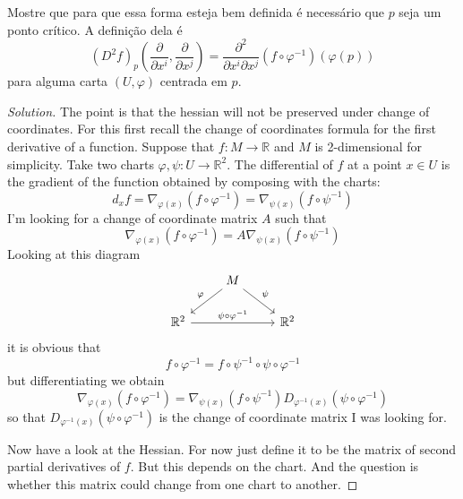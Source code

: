 \begin{exercise}\leavevmode
Mostre que para que essa forma esteja bem definida é necessário que \(p\) seja um ponto crítico. A definição dela é
\[(D^2f)_p\left(\frac{\partial }{\partial x^i}, \frac{\partial }{\partial x^j}\right) =\frac{\partial ^2}{\partial x^i \partial x^j}(f \circ \varphi^{-1})(\varphi(p))\]
para alguma carta \((U,\varphi)\) centrada em \(p\).

\begin{proof}[Solution]\leavevmode
	The point is that the hessian will not be preserved under change of coordinates. For this first recall the change of coordinates formula for the first derivative of a function. Suppose that  \(f: M \to \mathbb{R}\) and \( M\) is 2-dimensional for simplicity. Take two charts \(\varphi,\psi:U \to \mathbb{R}^2\). The differential of \(f\) at a point \(x \in U\) is the gradient of the function obtained by composing with the charts:
	\[d_xf=\nabla_{\varphi(x)}(f \circ \varphi^{-1})=\nabla_{\psi(x)}(f \circ \psi^{-1})\]
I'm looking for a change of coordinate matrix \(A\) such that
 \[\nabla_{\varphi(x)}(f \circ \varphi^{-1})=A\nabla_{\psi(x)}(f \circ \psi^{-1})\]
 Looking at this diagram
 \[\begin{tikzcd}
 &M\arrow[dl,"\varphi",swap]\arrow[dr,"\psi"]\\
 \mathbb{R}^2\arrow[rr,"\psi \circ \varphi^{-1}"]&&\mathbb{R}^2
 \end{tikzcd}\]
 it is obvious that
 \[f \circ \varphi^{-1}=f \circ \psi^{-1} \circ\psi \circ \varphi^{-1}\]
 but differentiating we obtain
 \[\nabla_{\varphi(x)}(f \circ \varphi^{-1})=\nabla_{\psi(x)}(f \circ \psi^{-1})D_{\varphi^{-1}(x)}(\psi \circ \varphi^{-1})\]
 so that \(D_{\varphi^{-1}(x)}(\psi \circ \varphi^{-1})\) is the change of coordinate matrix I was looking for.

 Now have a look at the Hessian. For now just define it to be the matrix of second partial derivatives of \(f\). But this depends on the chart. And the question is whether this matrix could change from one chart to another.


\end{proof}
\end{exercise}
